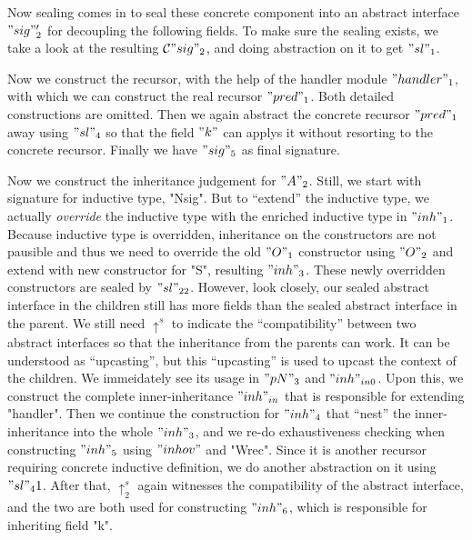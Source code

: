 Now sealing comes in to seal these concrete component into an abstract interface $"sig"_2'$ for decoupling the following fields. To make sure the sealing exists, we take a look at the resulting ${\mathcal{C}} "sig"_2$, and doing abstraction on it to get $"sl"_1$. 

Now we construct the recursor, with the help of the handler module $"handler"_1$, with which we can construct the real recursor $"pred"_1$. Both detailed constructions are omitted. Then we again abstract the concrete recursor $"pred"_1$ away using $"sl"_4$ so that the field $"k"$ can applys it without resorting to the concrete recursor. Finally we have $"sig"_5$ as final signature. 

Now we construct the inheritance judgement for $"A"_2$. Still, we start with signature for inductive type, "Nsig". But to ``extend'' the inductive type, we actually \textit{override} the inductive type with the enriched inductive type in $"inh"_1$. Because inductive type is overridden, inheritance on the constructors are not pausible and thus we need to override the old $"O"_1$ constructor using $"O"_2$ and extend with new constructor for "S", resulting $"inh"_3$. These newly overridden constructors are sealed by $"sl"_{22}$. However, look closely, our sealed abstract interface in the children still has more fields than the sealed abstract interface in the parent. We still need $\uparrow^s$ to indicate the ``compatibility'' between two abstract interfaces so that the inheritance from the parents can work. It can be understood as ``upcasting'', but this ``upcasting'' is used to upcast the context of the children. We immeidately see its usage in $"pN"_3$ and $"inh"_{in0}$. Upon this, we construct the complete inner-inheritance $"inh"_{in}$ that is responsible for extending "handler". Then we continue the construction for $"inh"_4$ that ``nest'' the inner-inheritance into the whole $"inh"_3$, and we re-do exhaustiveness checking when constructing $"inh"_5$ using $"inhov"$ and "Wrec". Since it is another recursor requiring concrete inductive definition, we do another abstraction on it using $"sl"_41$. After that, $\uparrow^s_2$ again witnesses the compatibility of the abstract interface, and the two are both used for constructing $"inh"_6$, which is responsible for inheriting field "k". 



